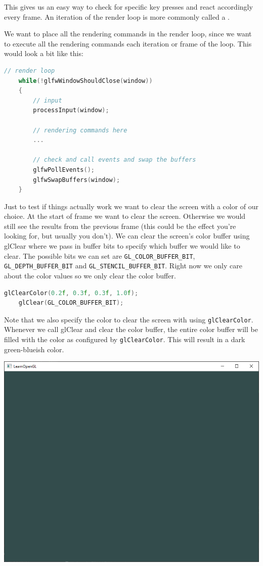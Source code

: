 This gives us an easy way to check for specific key presses and react accordingly every frame. An iteration of the render loop is more commonly called a .

We want to place all the rendering commands in the render loop, since we want to execute all the rendering commands each iteration or frame of the loop. This would look a bit like this:

\begin{lstlisting}[language=C++]
    // render loop
    while(!glfwWindowShouldClose(window))
    {
        // input
        processInput(window);

        // rendering commands here
        ...

        // check and call events and swap the buffers
        glfwPollEvents();
        glfwSwapBuffers(window);
    }
\end{lstlisting}

Just to test if things actually work we want to clear the screen with a color of our choice. At the start of frame we want to clear the screen. Otherwise we would still see the results from the previous frame (this could be the effect you're looking for, but usually you don't). We can clear the screen's color buffer using glClear where we pass in buffer bits to specify which buffer we would like to clear. The possible bits we can set are \verb|GL_COLOR_BUFFER_BIT|, \verb|GL_DEPTH_BUFFER_BIT| and \verb|GL_STENCIL_BUFFER_BIT|. Right now we only care about the color values so we only clear the color buffer.

\begin{lstlisting}[language=C++]
    glClearColor(0.2f, 0.3f, 0.3f, 1.0f);
    glClear(GL_COLOR_BUFFER_BIT);
\end{lstlisting}

Note that we also specify the color to clear the screen with using \verb|glClearColor|. Whenever we call glClear and clear the color buffer, the entire color buffer will be filled with the color as configured by \verb|glClearColor|. This will result in a dark green-blueish color.

\begin{center}
    \includegraphics[scale=0.4]{pics/hellowindow2.png}
\end{center}